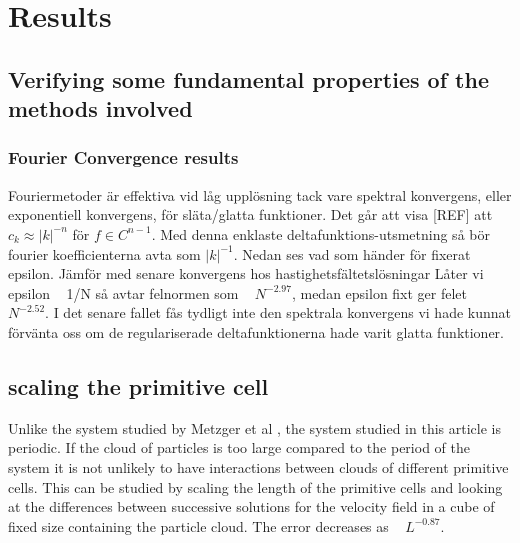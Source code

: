 \documentclass[a4paper,twoside=false,abstract=false,numbers=noenddot,
titlepage=false,headings=small,parskip=half,version=last]{scrartcl}
\begin{document}
\section{Results}

\subsection{Verifying some fundamental properties of the methods involved}
\subsubsection{Fourier Convergence results}
Fouriermetoder är effektiva vid låg upplösning tack vare spektral konvergens, eller exponentiell konvergens, för släta/glatta funktioner. Det går att visa [REF] att $c_k \approx |k|^{-n}$ för $f \in C^{n-1}$.
Med denna enklaste deltafunktions-utsmetning så bör fourier koefficienterna avta som $|k|^{-1}$.
Nedan ses vad som händer för fixerat epsilon. Jämför med senare 
konvergens hos hastighetsfältetslösningar
Låter vi epsilon ~ 1/N så avtar felnormen som ~ $N^{-2.97}$, medan epsilon fixt ger felet ~ $N^{-2.52}$. I det senare fallet fås tydligt inte den spektrala konvergens vi hade kunnat förvänta oss om de regulariserade deltafunktionerna hade varit glatta funktioner.
\subsection{}

\subsection{scaling the primitive cell}\label{cellscale}
Unlike the system studied by Metzger et al \cite{fallingclouds}, the system studied in this article is periodic. If the cloud of particles is too large compared to the period of the system it is not unlikely to have interactions between clouds of different primitive cells. This can be studied by scaling the length of the primitive cells and looking at the differences between successive solutions for the velocity field in a cube of fixed size containing the particle cloud. The error decreases as ~ $L^{-0.87}$.
\end{document}
